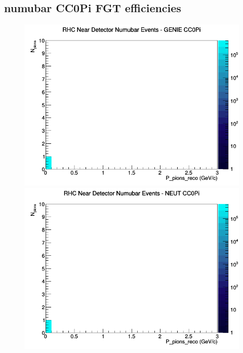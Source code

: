 \documentclass[12pt]{article}
\begin{document}
\subsection{numubar CC0Pi FGT efficiencies}
\begin{figure}[h]
\includegraphics[width=\linewidth]{eff_N_P/FGT/pions/CC0Pi_RHC_ND_numubar_N_P_GENIE.png}
\endminipage
{}
\includegraphics[width=\linewidth]{eff_N_P/FGT/pions/CC0Pi_RHC_ND_numubar_N_P_NEUT.png}
\endminipage
{}

\end{figure}
\end{document}
